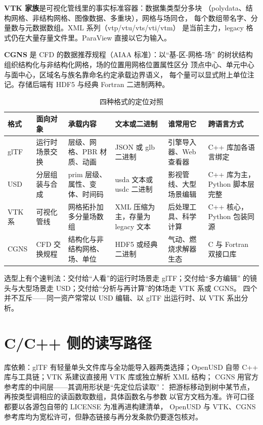 \documentclass[12pt,a4paper,fontset=fandol]{ctexbook}
\begin{document}
\textbf{VTK 家族}是可视化管线里的事实标准容器：数据集类型分多块
（polydata、结构网格、非结构网格、图像数据、多重块），网格与场同仓，
每个数组带名字、分量数与元数据数组。XML 系列（vtp/vtu/vts/vti/vtm）
是当前主力，legacy 格式仍在大量存量文件里。ParaView 直接以它为输入。

\textbf{CGNS} 是 CFD 的数据推荐规程（AIAA 标准）：以``基-区-网格-场''
的树状结构组织结构化与非结构化网格，场的位置用网格位置属性区分
顶点中心、单元中心与面中心，区域名与族名靠命名约定承载边界语义，
每个量可以显式附上单位注记。存储后端有 HDF5 与经典 Fortran 二进制两种。

\begin{table}[htbp]
\centering
\caption{四种格式的定位对照}
\label{tab:ch16-formats}
\begin{tabular}{>{\raggedright\arraybackslash}p{} >{\raggedright\arraybackslash}p{} >{\raggedright\arraybackslash}p{} >{\raggedright\arraybackslash}p{} >{\raggedright\arraybackslash}p{} >{\raggedright\arraybackslash}p{}}
\toprule
格式 & 面向对象 & 承载内容 & 文本或二进制 & 谁常用它 & 跨语言方式 \\
\midrule
glTF & 运行时场景交换 & 层级、网格、PBR 材质、动画 & JSON 或 glb 二进制 & 引擎导入器、Web 查看器 & C++ 库加各语言绑定 \\
USD & 分层组装与合成 & prim 层级、属性、变体、时间码 & usda 文本或 usdc 二进制 & 影视管线、大型场景编辑 & C++ 库为主，Python 脚本层完整 \\
VTK 系 & 可视化管线 & 网格拓扑加多分量场数组 & XML 压缩为主，存量为 legacy 文本 & 后处理工具、科学计算 & C++ 核心，Python 包装同源 \\
CGNS & CFD 交换规程 & 结构化与非结构网格、场、单位 & HDF5 或经典二进制 & 气动、燃烧求解器生态 & C 与 Fortran 双接口库 \\
\bottomrule
\end{tabular}
\end{table}

选型上有个速判法：交付给``人看''的运行时场景走 glTF；交付给``多方编辑''
的镜头与大型场景走 USD；交付给``分析与再计算''的体场走 VTK 系或 CGNS。
四个并不互斥——同一资产常常以 USD 编辑、以 glTF 出运行时、以 VTK 系出分析。

\section{C/C++ 侧的读写路径}
\label{sec:ch16-cpp-path}

库依赖：glTF 有轻量单头文件库与全功能导入器两类选择；OpenUSD 自带
C++ 库与工具链；VTK 系建议直接用 VTK 库或独立解析 XML 结构；
CGNS 用官方参考库的中间层——其调用形状是``先定位后读取''：
把游标移动到树中某节点，再按类型调相应的读函数取数组，具体函数名与参数
以官方文档为准。许可口径都要以各源包自带的 LICENSE 为准再进构建清单，
OpenUSD 与 VTK、CGNS 参考库均为宽松许可，但静态链接与再分发条款仍要逐包核对。
\end{document}

